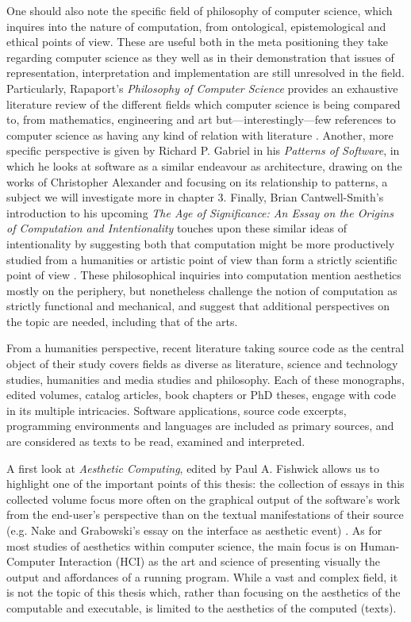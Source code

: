 One should also note the specific field of philosophy of computer science, which inquires into the nature of computation, from ontological, epistemological and ethical points of view. These are useful both in the meta positioning they take regarding computer science as they well as in their demonstration that issues of representation, interpretation and implementation are still unresolved in the field. Particularly, Rapaport's \emph{Philosophy of Computer Science} provides an exhaustive literature review of the different fields which computer science is being compared to, from mathematics, engineering and art but—interestingly—few references to computer science as having any kind of relation with literature \citep{rapaport_philosophy_2005}. Another, more specific perspective is given by Richard P. Gabriel in his \emph{Patterns of Software}, in which he looks at software as a similar endeavour as architecture, drawing on the works of Christopher Alexander and focusing on its relationship to patterns, a subject we will investigate more in chapter 3. Finally, Brian Cantwell-Smith's introduction to his upcoming \emph{The Age of Significance: An Essay on the Origins of Computation and Intentionality} touches upon these similar ideas of intentionality by suggesting both that computation might be more productively studied from a humanities or artistic point of view than form a strictly scientific point of view \citep{smith_origin_1998}. These philosophical inquiries into computation mention aesthetics mostly on the periphery, but nonetheless challenge the notion of computation as strictly functional and mechanical, and suggest that additional perspectives on the topic are needed, including that of the arts.

From a humanities perspective, recent literature taking source code as the central object of their study covers fields as diverse as literature, science and technology studies, humanities and media studies and philosophy. Each of these monographs, edited volumes, catalog articles, book chapters or PhD theses, engage with code in its multiple intricacies. Software applications, source code excerpts, programming environments and languages are included as primary sources, and are considered as texts to be read, examined and interpreted.

A first look at \emph{Aesthetic Computing}, edited by Paul A. Fishwick allows us to highlight one of the important points of this thesis: the collection of essays in this collected volume focus more often on the graphical output of the software's work from the end-user's perspective than on the textual manifestations of their source (e.g. Nake and Grabowski's essay on the interface as aesthetic event) \citep{fishwick_aesthetic_2006a}. As for most studies of aesthetics within computer science, the main focus is on Human-Computer Interaction (HCI) as the art and science of presenting visually the output and affordances of a running program. While a vast and complex field, it is not the topic of this thesis which, rather than focusing on the aesthetics of the computable and executable, is limited to the aesthetics of the computed (texts).

